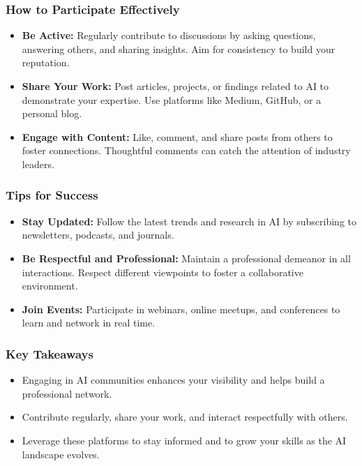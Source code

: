 \documentclass{beamer}
\begin{document}
\begin{frame}[fragile]
    \frametitle{How to Participate Effectively}
    \begin{itemize}
        \item \textbf{Be Active:} 
            Regularly contribute to discussions by asking questions, answering others, and sharing insights. Aim for consistency to build your reputation.
        \item \textbf{Share Your Work:} 
            Post articles, projects, or findings related to AI to demonstrate your expertise. Use platforms like Medium, GitHub, or a personal blog.
        \item \textbf{Engage with Content:} 
            Like, comment, and share posts from others to foster connections. Thoughtful comments can catch the attention of industry leaders.
    \end{itemize}
\end{frame}

\begin{frame}[fragile]
    \frametitle{Tips for Success}
    \begin{itemize}
        \item \textbf{Stay Updated:} 
            Follow the latest trends and research in AI by subscribing to newsletters, podcasts, and journals.
        \item \textbf{Be Respectful and Professional:} 
            Maintain a professional demeanor in all interactions. Respect different viewpoints to foster a collaborative environment.
        \item \textbf{Join Events:} 
            Participate in webinars, online meetups, and conferences to learn and network in real time.
    \end{itemize}
\end{frame}

\begin{frame}[fragile]
    \frametitle{Key Takeaways}
    \begin{itemize}
        \item Engaging in AI communities enhances your visibility and helps build a professional network.
        \item Contribute regularly, share your work, and interact respectfully with others.
        \item Leverage these platforms to stay informed and to grow your skills as the AI landscape evolves.
    \end{itemize}
\end{frame}
\end{document}
